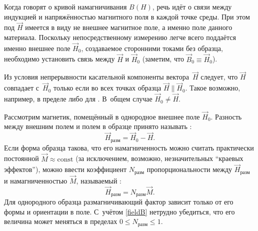%


\label{sec:measure-HB}


Когда говорят о кривой намагничивания $B(H)$,
речь идёт о  связи между
индукцией и напряжённостью магнитного поля в каждой точке среды.
При этом под $\vec{H}$ имеется в виду не внешнее магнитное поле,
а именно поле  данного материала. Поскольку непосредственному
измерению легче всего поддаётся именно внешнее поле $\vec{H}_{0}$,
создаваемое сторонними токами без образца, необходимо установить связь
между $\vec{H}$ и $\vec{H}_0$ (заметим, что $\vec{B}_0\equiv \vec{H}_0$).

Из условия непрерывности касательной компоненты вектора~$\vec{H}$ следует,
что $\vec{H}$ совпадает с~$\vec{H}_{0}$ только если во всех точках образца
$\vec{H} \parallel \vec{H}_{0}$.
Такое возможно, например, в пределе  либо
для .
В~общем случае $\vec{H}_0 \ne \vec{H}$.

Рассмотрим магнетик, помещённый в однородное внешнее поле $\vec{H}_0$.
Разность между внешним полем и полем в образце принято называть
:
\begin{equation}
\vec{H}_{разм} = \vec{H}_0 - \vec{H}.
\end{equation}
Если форма образца такова, что его намагниченность можно считать
практически постоянной $\vec{M}\approx\mathrm{const}$ (за исключением,
возможно, незначительных ``краевых эффектов''), можно ввести
коэффициент $N_{разм}$  пропорциональности 
между $\vec{H}_{разм}$ и намагниченностью $\vec{M}$,
называемый :
\begin{equation}
\vec{H}_{разм}  = N_{разм}\vec{M}.
\end{equation}
Для однородного образца размагничивающий фактор зависит
только от его формы и ориентации в поле.
С~учётом \eqref{fieldB} нетрудно убедиться, что его величина может меняться в пределах $0\le N_{разм} \le 1$.

